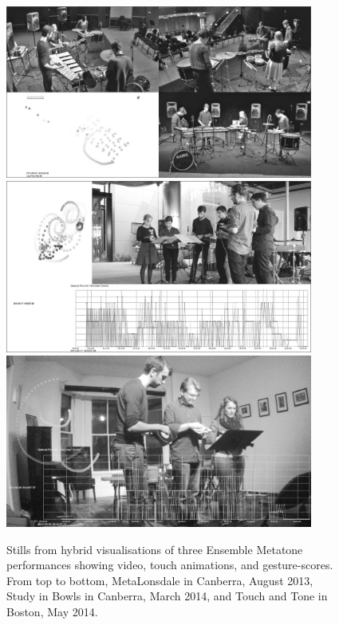 \documentclass[graybox]{svmult}
\begin{document}
\begin{figure}
  \centering
  \includegraphics[width=0.9\textwidth]{figures/metatone-visualisation-metalonsdale-bw}
  \includegraphics[width=0.9\textwidth]{figures/metatone-visualisation-youarehere-bw}
  \includegraphics[width=0.9\textwidth]{figures/metatone-visualisation-touchandtone-bw}
  \caption{Stills from hybrid visualisations of three Ensemble Metatone
    performances showing video, touch animations, and gesture-scores.
    From top to bottom, MetaLonsdale in Canberra, August 2013, Study
    in Bowls in Canberra, March 2014, and Touch and Tone in Boston,
    May 2014.}
  \label{fig:metatone-visualisations}
\end{figure}
\end{document}
